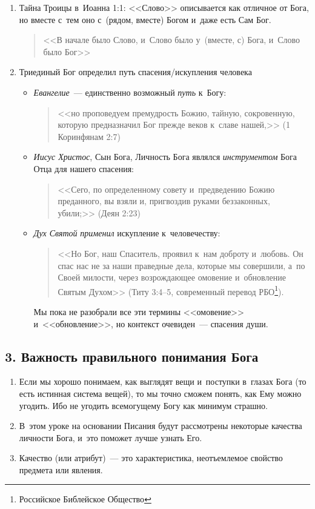 \documentclass[a4paper,12pt]{article}
\begin{document}
\begin{enumerate}
    \item Тайна Троицы в~Иоанна 1:1: <<Слово>> описывается как отличное от Бога, но вместе с~тем оно с~(рядом, вместе) Богом и~даже есть Сам Бог.
        \begin{quote} 
        <<В начале было Слово, и~Слово было у~(вместе, с) Бога, и~Слово было Бог>> 
        \end{quote}

    \item Триединый Бог определил путь спасения/искупления человека
        \begin{itemize}
        \item \emph{Евангелие}~--- единственно возможный \emph{путь} к~Богу: 
        \begin{quote}
        <<но проповедуем премудрость Божию, тайную, сокровенную, которую предназначил Бог прежде веков к~славе нашей,>> (1 Коринфянам 2:7)    
        \end{quote}
        
        \item \emph{Иисус Христос}, Сын Бога, Личность Бога являлся \emph{инструментом} Бога Отца для нашего спасения: 
        \begin{quote}
        <<Сего, по определенному совету и~предведению Божию преданного, вы взяли и, пригвоздив руками беззаконных, убили;>> (Деян 2:23)    
        \end{quote}
        
        \item \emph{Дух Святой} \emph{применил} искупление к~человечеству:
        \begin{quote}
        <<Но Бог, наш Спаситель, проявил к~нам доброту и~любовь. Он спас нас не за наши праведные дела, которые мы совершили, а~по Своей милости, через возрождающее омовение и~обновление Святым Духом>> (Титу 3:4--5, современный перевод РБО\footnote{Российское Библейское Общество}).
        \end{quote} 
        Мы пока не разобрали все эти термины <<омовение>> и~<<обновление>>, но контекст очевиден~--- спасения души.
        \end{itemize}
\end{enumerate}

\subsection{3. Важность правильного понимания Бога}
\begin{enumerate}
    \item Если мы хорошо понимаем, как выглядят вещи и~поступки в~глазах Бога (то есть истинная система вещей), то мы точно сможем понять, как Ему можно угодить. Ибо не угодить всемогущему Богу как минимум страшно. 
    \item В~этом уроке на основании Писания будут рассмотрены некоторые качества личности Бога, и~это поможет лучше узнать Его.
    \item Качество (или атрибут)~--- это характеристика, неотъемлемое свойство предмета или явления. 
\end{enumerate}
\end{document}
